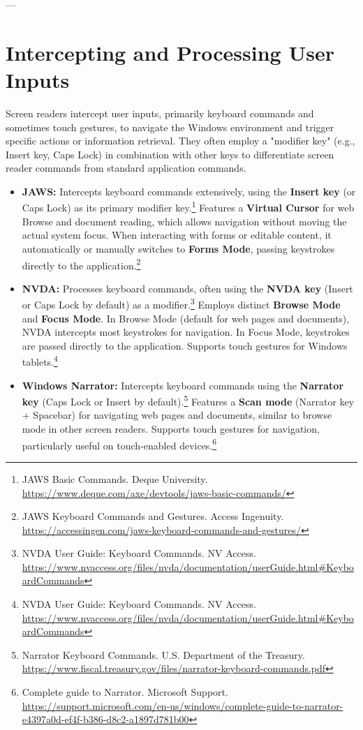---

\section{Intercepting and Processing User Inputs}

Screen readers intercept user inputs, primarily keyboard commands and sometimes touch gestures, to navigate the Windows environment and trigger specific actions or information retrieval. They often employ a "modifier key" (e.g., Insert key, Caps Lock) in combination with other keys to differentiate screen reader commands from standard application commands.

\begin{itemize}[leftmargin=*,noitemsep,topsep=0pt]
    \item \textbf{JAWS:} Intercepts keyboard commands extensively, using the \textbf{Insert key} (or Caps Lock) as its primary modifier key.\footnote{JAWS Basic Commands. Deque University. \url{https://www.deque.com/axe/devtools/jaws-basic-commands/}} Features a \textbf{Virtual Cursor} for web Browse and document reading, which allows navigation without moving the actual system focus. When interacting with forms or editable content, it automatically or manually switches to \textbf{Forms Mode}, passing keystrokes directly to the application.\footnote{JAWS Keyboard Commands and Gestures. Access Ingenuity. \url{https://accessingen.com/jaws-keyboard-commands-and-gestures/}}
    \item \textbf{NVDA:} Processes keyboard commands, often using the \textbf{NVDA key} (Insert or Caps Lock by default) as a modifier.\footnote{NVDA User Guide: Keyboard Commands. NV Access. \url{https://www.nvaccess.org/files/nvda/documentation/userGuide.html#KeyboardCommands}} Employs distinct \textbf{Browse Mode} and \textbf{Focus Mode}. In Browse Mode (default for web pages and documents), NVDA intercepts most keystrokes for navigation. In Focus Mode, keystrokes are passed directly to the application. Supports touch gestures for Windows tablets.\footnote{NVDA User Guide: Keyboard Commands. NV Access. \url{https://www.nvaccess.org/files/nvda/documentation/userGuide.html#KeyboardCommands}}
    \item \textbf{Windows Narrator:} Intercepts keyboard commands using the \textbf{Narrator key} (Caps Lock or Insert by default).\footnote{Narrator Keyboard Commands. U.S. Department of the Treasury. \url{https://www.fiscal.treasury.gov/files/narrator-keyboard-commands.pdf}} Features a \textbf{Scan mode} (Narrator key + Spacebar) for navigating web pages and documents, similar to browse mode in other screen readers. Supports touch gestures for navigation, particularly useful on touch-enabled devices.\footnote{Complete guide to Narrator. Microsoft Support. \url{https://support.microsoft.com/en-us/windows/complete-guide-to-narrator-e4397a0d-ef4f-b386-d8c2-a1897d781b00}}

\end{itemize}
